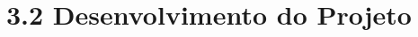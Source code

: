\hypertarget{__RefHeading___Toc4771_3118176633}{}
\hypertarget{_Toc456271461}{}
\section*{3.2 Desenvolvimento do Projeto}
\label{ages-ii:text-h-0041}
